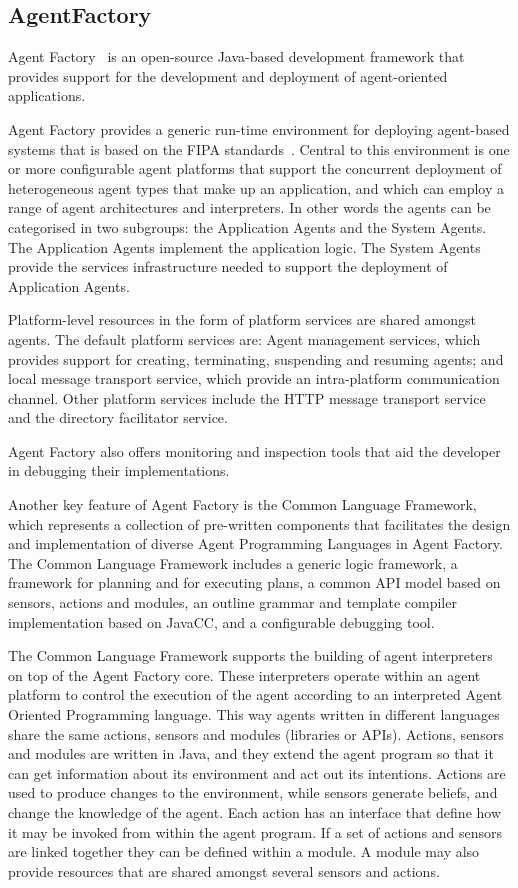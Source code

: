 \documentclass[a4paper,12pt,oneside,fleqn]{book} %
\begin{document}
\subsection{AgentFactory} %

Agent Factory~\cite{collier2002agent} is an open-source Java-based
development framework that provides support for the development and
deployment of agent-oriented applications.

Agent Factory provides a generic run-time environment for deploying
agent-based systems that is based on the FIPA
standards~\cite{poslad2000fipa}.  Central to this environment is one or
more configurable agent platforms that support the concurrent deployment of
heterogeneous agent types that make up an application, and which can employ
a range of agent architectures and interpreters. In other words the agents
can be categorised in two subgroups: the Application Agents and the System
Agents. The Application Agents implement the application logic. The System
Agents provide the services infrastructure needed to support the deployment
of Application Agents.

Platform-level resources in the form of platform services are shared
amongst agents. The default platform services are: Agent management
services, which provides support for creating, terminating, suspending and
resuming agents; and local message transport service, which provide an
intra-platform communication channel. Other platform services include the
HTTP message transport service and the directory facilitator service.

Agent Factory also offers monitoring and inspection tools that aid the
developer in debugging their implementations.

Another key feature of Agent Factory is the Common Language Framework,
which represents a collection of pre-written components that facilitates
the design and implementation of diverse Agent Programming Languages in
Agent Factory\null. The Common Language Framework includes a generic logic
framework, a framework for planning and for executing plans, a common API
model based on sensors, actions and modules, an outline grammar and
template compiler implementation based on JavaCC, and a configurable
debugging tool.

The Common Language Framework supports the building of agent interpreters
on top of the Agent Factory core. These interpreters operate within an
agent platform to control the execution of the agent according to an
interpreted Agent Oriented Programming language. This way agents written in
different languages share the same actions, sensors and modules (libraries
or APIs). Actions, sensors and modules are written in Java, and they extend
the agent program so that it can get information about its environment and
act out its intentions. Actions are used to produce changes to the
environment, while sensors generate beliefs, and change the knowledge of
the agent. Each action has an interface that define how it may be invoked
from within the agent program. If a set of actions and sensors are linked
together they can be defined within a module. A module may also provide
resources that are shared amongst several sensors and actions.
\end{document}
